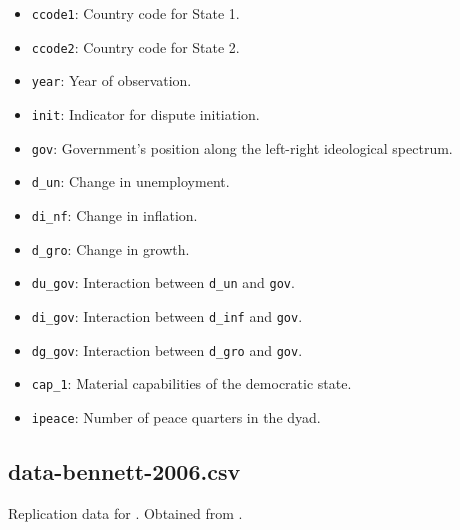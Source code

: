 \documentclass[12pt]{article}
\begin{document}
\begin{itemize}
  \item \texttt{ccode1}: Country code for State 1.
  \item \texttt{ccode2}: Country code for State 2.
  \item \texttt{year}: Year of observation.
  \item \texttt{init}: Indicator for dispute initiation.
  \item \texttt{gov}: Government's position along the left-right ideological spectrum. 
  \item \texttt{d\_un}: Change in unemployment.
  \item \texttt{di\_nf}: Change in inflation.
  \item \texttt{d\_gro}: Change in growth.
  \item \texttt{du\_gov}: Interaction between \texttt{d\_un} and \texttt{gov}.
  \item \texttt{di\_gov}: Interaction between \texttt{d\_inf} and \texttt{gov}.
  \item \texttt{dg\_gov}: Interaction between \texttt{d\_gro} and \texttt{gov}.
  \item \texttt{cap\_1}: Material capabilities of the democratic state.
  \item \texttt{ipeace}: Number of peace quarters in the dyad.
\end{itemize}

\subsection{data-bennett-2006.csv}

Replication data for \citet{Bennett:2006gp}.
Obtained from \citet{bennett2006data}.
\end{document}
